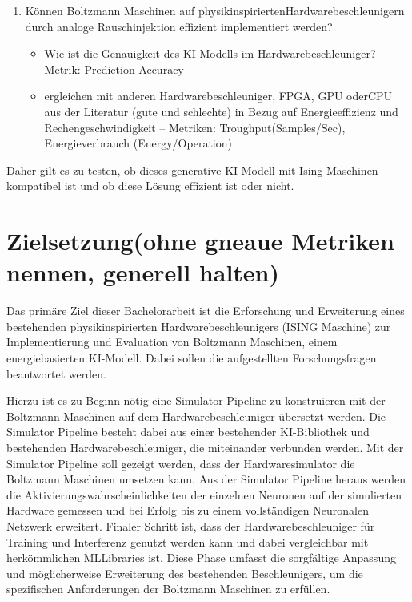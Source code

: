 \begin{enumerate}
    \item {Können Boltzmann Maschinen auf physikinspiriertenHardwarebeschleunigern durch analoge Rauschinjektion effizient implementiert werden?}
        \begin{itemize}
            \item Wie ist die Genauigkeit des KI-Modells im Hardwarebeschleuniger? Metrik: Prediction Accuracy

            \item ergleichen mit anderen Hardwarebeschleuniger, FPGA, GPU oderCPU aus der Literatur (gute und schlechte) in Bezug auf Energieeffizienz und Rechengeschwindigkeit – Metriken: Troughput(Samples/Sec), Energieverbrauch (Energy/Operation)
        \end{itemize}  
\end{enumerate}

Daher gilt es zu testen, ob dieses generative KI-Modell mit Ising Maschinen
kompatibel ist und ob diese Lösung effizient ist oder nicht.


\section{Zielsetzung(ohne gneaue Metriken nennen, generell halten)}

Das primäre Ziel dieser Bachelorarbeit ist die Erforschung und Erweiterung eines
bestehenden physikinspirierten Hardwarebeschleunigers (ISING Maschine) zur
Implementierung und Evaluation von Boltzmann Maschinen, einem
energiebasierten KI-Modell. Dabei sollen die aufgestellten Forschungsfragen
beantwortet werden.

Hierzu ist es zu Beginn nötig eine Simulator Pipeline zu konstruieren mit der
Boltzmann Maschinen auf dem Hardwarebeschleuniger übersetzt werden. Die
Simulator Pipeline besteht dabei aus einer bestehender KI-Bibliothek und
bestehenden Hardwarebeschleuniger, die miteinander verbunden werden. Mit der
Simulator Pipeline soll gezeigt werden, dass der Hardwaresimulator die Boltzmann
Maschinen umsetzen kann. Aus der Simulator Pipeline heraus werden die
Aktivierungswahrscheinlichkeiten der einzelnen Neuronen auf der simulierten
Hardware gemessen und bei Erfolg bis zu einem vollständigen Neuronalen
Netzwerk erweitert. Finaler Schritt ist, dass der Hardwarebeschleuniger für Training
und Interferenz genutzt werden kann und dabei vergleichbar mit herkömmlichen MLLibraries ist. Diese Phase umfasst die sorgfältige Anpassung und möglicherweise
Erweiterung des bestehenden Beschleunigers, um die spezifischen Anforderungen
der Boltzmann Maschinen zu erfüllen.

